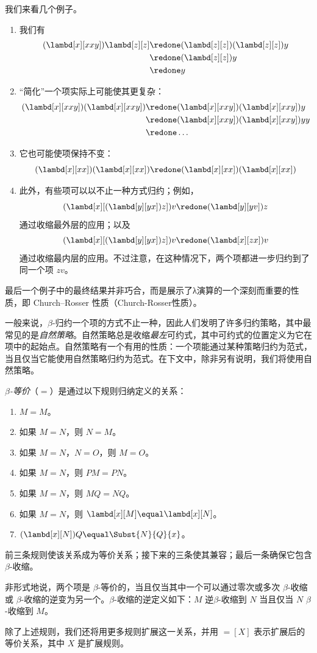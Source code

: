 \documentclass[../../../include/open-logic-section]{subfiles}
\begin{document}
我们来看几个例子。
\begin{enumerate}
\item 我们有
\begin{align*}
(\lambd[x][xxy]) \lambd[z][z] & \redone (\lambd[z][z])(\lambd[z][z]) y \\
& \redone (\lambd[z][z]) y \\
& \redone y
\end{align*}
\item “简化”一个项实际上可能使其更复杂：
\begin{align*}
(\lambd[x][xxy])(\lambd[x][xxy]) & \redone (\lambd[x][xxy])(\lambd[x][xxy])y \\
& \redone (\lambd[x][xxy])(\lambd[x][xxy])yy \\
& \redone \dots
\end{align*}
\item 它也可能使项保持不变：
\[
(\lambd[x][xx])(\lambd[x][xx]) \redone (\lambd[x][xx])(\lambd[x][xx])
\]
\item 此外，有些项可以以不止一种方式归约；例如，
\[
(\lambd[x][(\lambd[y][yx]) z]) v \redone (\lambd[y][yv]) z
\]
通过收缩最外层的应用；以及
\[
(\lambd[x][(\lambd[y][yx]) z]) v \redone (\lambd[x][zx]) v
\]
通过收缩最内层的应用。不过注意，在这种情况下，两个项都进一步归约到了同一个项 $zv$。
\end{enumerate}

最后一个例子中的最终结果并非巧合，而是展示了λ演算的一个深刻而重要的性质，即 Church--Rosser 性质（Church-Rosser性质）。

\begin{digress}
  一般来说，$\beta$-归约一个项的方式不止一种，因此人们发明了许多归约策略，其中最常见的是\emph{自然策略}。自然策略总是收缩\emph{最左}可约式，其中可约式的位置定义为它在项中的起始点。自然策略有一个有用的性质：一个项能通过某种策略归约为范式，当且仅当它能使用自然策略归约为范式。在下文中，除非另有说明，我们将使用自然策略。
\end{digress}

\begin{defn}
  \emph{$\beta$-等价}（$\equal$）是通过以下规则归纳定义的关系：
  \begin{enumerate}
  \item $M \equal M$。
  \item 如果 $M \equal N$，则 $N \equal M$。
  \item 如果 $M \equal N$，$N \equal O$，则 $M \equal O$。
  \item 如果 $M \equal N$，则 $PM \equal PN$。
  \item 如果 $M \equal N$，则 $MQ \equal NQ$。
  \item 如果 $M \equal N$，则 $\lambd[x][M] \equal \lambd[x][N]$。
  \item $(\lambd[x][N])Q \equal \Subst{N}{Q}{x}$。
  \end{enumerate}
\end{defn}

前三条规则使该关系成为等价关系；接下来的三条使其兼容；最后一条确保它包含 $\beta$-收缩。

非形式地说，两个项是 $\beta$-等价的，当且仅当其中一个可以通过零次或多次 $\beta$-收缩或 $\beta$-收缩的逆变为另一个。$\beta$-收缩的逆定义如下：$M$ 逆$\beta$-收缩到 $N$ 当且仅当 $N$ $\beta$-收缩到 $M$。

除了上述规则，我们还将用更多规则扩展这一关系，并用 $\equal[X]$ 表示扩展后的等价关系，其中 $X$ 是扩展规则。
\end{document}
